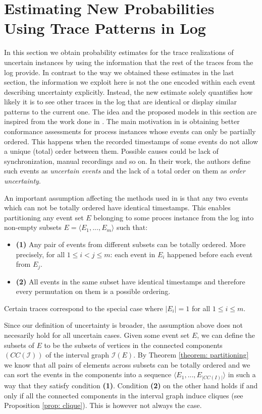 \section{Estimating New Probabilities Using Trace Patterns in Log }
In this section we obtain probability estimates for the trace realizations of uncertain instances by using the information that the rest of the traces from the log provide.
In contrast to the way we obtained these estimates in the last section, the information we exploit here is not the one encoded within each event describing uncertainty explicitly. 
Instead, the new estimate solely quantifies how likely it is to see other traces in the log that are identical or display similar patterns to the current one.
The idea and the proposed models in this section are inspired from the work done in \cite{por}.
The main motivation in \cite{por} is obtaining better conformance assessments for process instances whose events can only be partially ordered.
This happens when the recorded timestamps of some events do not allow a unique (total) order between them.
Possible causes could be lack of synchronization, manual recordings and so on.
In their work, the authors define such events as \textit{uncertain events} and the lack of a  total order on them as \textit{order uncertainty}.

An important assumption affecting the methods used in \cite{por} is that any two events which can not be totally ordered have identical timestamps.
This enables partitioning any event set $E$ belonging to some proces instance from the log into non-empty subsets $E=\langle E_1,...,E_m \rangle $ such that:
\begin{itemize}
\item \textbf{(1)} Any pair of events from different subsets can be totally ordered.
More precisely, for all $1 \leq i < j \leq m$: each event in $E_i$ happened before each event from $E_j$.  
\item \textbf{(2)} All events in the same subset have identical timestamps and therefore every permutation on them is a possible ordering.
\end{itemize}
Certain traces correspond to the special case where $|E_i| = 1$ for all $1 \leq i \leq m$.

Since our definition of uncertainty is broader, the assumption above does not necesarily hold for all uncertain cases.
Given some event set $E$, we can define the subsets of $E$ to be the subsets of vertices in the connected components $(CC(\mathcal{I}))$ of the interval graph $\mathcal{I}(E)$.
By Theorem \ref{theorem: partitioning} we know that all pairs of elements across subsets can be totally ordered and we can sort the events in the components into a sequence $\langle E_1,...,E_{|CC(I)|}\rangle$ in such a way that they satisfy condition \textbf{(1)}.
Condition \textbf{(2)} on the other hand holds if and only if all the connected components in the interval graph induce cliques (see Proposition \ref{prop: clique}).
This is however not always the case.

